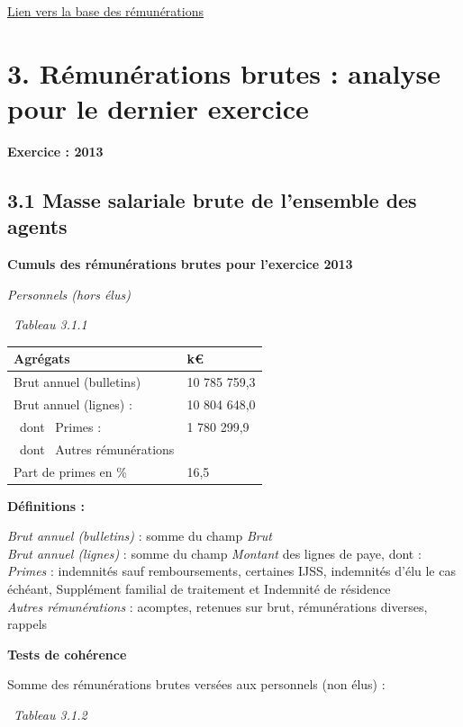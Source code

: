 \href{../Bases/Remunerations/Analyse.remunerations.csv}{Lien vers la base
des rémunérations}

\newpage

\hypertarget{remunerations-brutes-analyse-pour-le-dernier-exercice}{%
\section{3. Rémunérations brutes : analyse pour le dernier
exercice}\label{remunerations-brutes-analyse-pour-le-dernier-exercice}}

\textbf{Exercice : 2013 }

\hypertarget{masse-salariale-brute-de-lensemble-des-agents-1}{%
\subsection{3.1 Masse salariale brute de l'ensemble des
agents}\label{masse-salariale-brute-de-lensemble-des-agents-1}}

\textbf{Cumuls des rémunérations brutes pour l'exercice 2013 }

\emph{Personnels (hors élus)}

~\emph{Tableau 3.1.1}

\begin{longtable}[]{@{}ll@{}}
\toprule
Agrégats & k€\tabularnewline
\midrule
\endhead
Brut annuel (bulletins) & 10 785 759,3\tabularnewline
Brut annuel (lignes) : & 10 804 648,0\tabularnewline
~dont ~Primes : & 1 780 299,9\tabularnewline
~dont ~Autres rémunérations &\tabularnewline
Part de primes en \% & 16,5\tabularnewline
\bottomrule
\end{longtable}

\textbf{Définitions :}

\emph{Brut annuel (bulletins)} : somme du champ \emph{Brut}\\
\emph{Brut annuel (lignes)} : somme du champ \emph{Montant} des lignes
de paye, dont :\\
\emph{Primes} : indemnités sauf remboursements, certaines IJSS,
indemnités d'élu le cas échéant, Supplément familial de traitement et
Indemnité de résidence\\
\emph{Autres rémunérations} : acomptes, retenues sur brut, rémunérations
diverses, rappels

\textbf{Tests de cohérence}

Somme des rémunérations brutes versées aux personnels (non élus) :

~\emph{Tableau 3.1.2}

